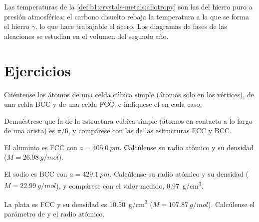 \begin{remark}\label{rem:b1:crystals-metals:iron-T}
Las temperaturas de la \cref{def:b1:crystals-metals:allotropy} son las del
hierro puro a presión atmosférica; el carbono disuelto rebaja la
temperatura a la que se forma el hierro $\gamma$, lo que hace trabajable
el acero. Los diagramas de fases de las aleaciones se estudian en el
volumen del segundo año.
\end{remark}

\section{Ejercicios}

\begin{exercise}[$\star$]\label{exo:b1:crystals-metals:1}
Cuéntense los átomos de una celda cúbica simple (átomos solo en los
vértices), de una celda BCC y de una celda FCC, e indíquese el  en cada caso.
\end{exercise}

\begin{exercise}[$\star$]\label{exo:b1:crystals-metals:2}
Demuéstrese que la  de la estructura cúbica simple (átomos en
contacto a lo largo de una arista) es $\pi/6$, y compárese con las de las
estructuras FCC y BCC.
\end{exercise}

\begin{exercise}[$\star$]\label{exo:b1:crystals-metals:3}
El aluminio es FCC con $a = \qty{405.0}{pm}$. Calcúlense su radio
atómico y su densidad ($M = \qty{26.98}{g/mol}$).
\end{exercise}

\begin{exercise}[$\star$]\label{exo:b1:crystals-metals:4}
El sodio es BCC con $a = \qty{429.1}{pm}$. Calcúlense su radio atómico y
su densidad ($M = \qty{22.99}{g/mol}$), y compárese con el valor medido,
\qty{0.97}{g/cm^3}.
\end{exercise}

\begin{exercise}[$\star\star$]\label{exo:b1:crystals-metals:5}
La plata es FCC y su densidad es \qty{10.50}{g/cm^3}
($M = \qty{107.87}{g/mol}$). Calcúlense el parámetro de  y el radio
atómico.
\end{exercise}

